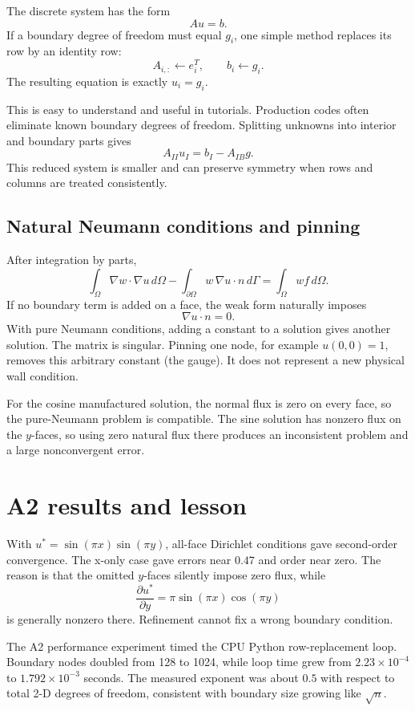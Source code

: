 \documentclass[11pt]{article}
\begin{document}
The discrete system has the form
\[
 A u=b.
\]
If a boundary degree of freedom must equal $g_i$, one simple method replaces
its row by an identity row:
\[
 A_{i,:}\leftarrow e_i^T, \qquad b_i\leftarrow g_i.
\]
The resulting equation is exactly $u_i=g_i$.

This is easy to understand and useful in tutorials. Production codes often
eliminate known boundary degrees of freedom. Splitting unknowns into interior
and boundary parts gives
\[
 A_{II}u_I=b_I-A_{IB}g.
\]
This reduced system is smaller and can preserve symmetry when rows and
columns are treated consistently.

\subsection{Natural Neumann conditions and pinning}

After integration by parts,
\[
 \int_\Omega \nabla w\cdot\nabla u\,d\Omega
 -\int_{\partial\Omega}w\,\nabla u\cdot n\,d\Gamma
 =\int_\Omega wf\,d\Omega.
\]
If no boundary term is added on a face, the weak form naturally imposes
\[
 \nabla u\cdot n=0.
\]
With pure Neumann conditions, adding a constant to a solution gives another
solution. The matrix is singular. Pinning one node, for example $u(0,0)=1$,
removes this arbitrary constant (the gauge). It does not represent a new
physical wall condition.

For the cosine manufactured solution, the normal flux is zero on every face,
so the pure-Neumann problem is compatible. The sine solution has nonzero flux
on the $y$-faces, so using zero natural flux there produces an inconsistent
problem and a large nonconvergent error.

\section{A2 results and lesson}

With $u^*=\sin(\pi x)\sin(\pi y)$, all-face Dirichlet conditions gave
second-order convergence. The x-only case gave errors near $0.47$ and order
near zero. The reason is that the omitted $y$-faces silently impose zero
flux, while
\[
 \frac{\partial u^*}{\partial y}
 =\pi\sin(\pi x)\cos(\pi y)
\]
is generally nonzero there. Refinement cannot fix a wrong boundary condition.

The A2 performance experiment timed the CPU Python row-replacement loop.
Boundary nodes doubled from 128 to 1024, while loop time grew from
$2.23\times10^{-4}$ to $1.792\times10^{-3}$ seconds. The measured exponent
was about $0.5$ with respect to total 2-D degrees of freedom, consistent with
boundary size growing like $\sqrt n$.
\end{document}

